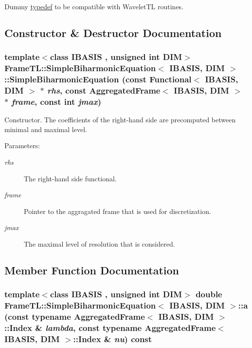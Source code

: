 Dummy \hyperlink{structtypedef}{typedef} to be compatible with WaveletTL routines. 

\subsection{Constructor \& Destructor Documentation}
\hypertarget{classFrameTL_1_1SimpleBiharmonicEquation_ef39e6a2ad2a5ba99862edf485ea0466}{
\subsubsection[{SimpleBiharmonicEquation}]{\setlength{\rightskip}{0pt plus 5cm}template$<$class IBASIS , unsigned int DIM$>$ {\bf FrameTL::SimpleBiharmonicEquation}$<$ IBASIS, DIM $>$::{\bf SimpleBiharmonicEquation} (const {\bf Functional}$<$ IBASIS, DIM $>$ $\ast$ {\em rhs}, \/  const {\bf AggregatedFrame}$<$ IBASIS, DIM $>$ $\ast$ {\em frame}, \/  const int {\em jmax})}}
\label{classFrameTL_1_1SimpleBiharmonicEquation_ef39e6a2ad2a5ba99862edf485ea0466}


Constructor. The coefficients of the right-hand side are precomputed between minimal and maximal level.

\begin{Desc}
\item[Parameters:]
\begin{description}
\item[{\em rhs}]The right-hand side functional. \item[{\em frame}]Pointer to the aggragated frame that is used for discretization. \item[{\em jmax}]The maximal level of resolution that is considered. \end{description}
\end{Desc}


\subsection{Member Function Documentation}
\hypertarget{classFrameTL_1_1SimpleBiharmonicEquation_736592304b02f99e4a44068508072d89}{
\subsubsection[{a}]{\setlength{\rightskip}{0pt plus 5cm}template$<$class IBASIS , unsigned int DIM$>$ double {\bf FrameTL::SimpleBiharmonicEquation}$<$ IBASIS, DIM $>$::a (const typename {\bf AggregatedFrame}$<$ IBASIS, DIM $>$::{\bf Index} \& {\em lambda}, \/  const typename {\bf AggregatedFrame}$<$ IBASIS, DIM $>$::{\bf Index} \& {\em nu}) const}}
\label{classFrameTL_1_1SimpleBiharmonicEquation_736592304b02f99e4a44068508072d89}



